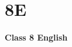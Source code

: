 \label{4 C8 English}
    \section{8E}
    \begin{frame}
    \begin{center}
    \begin{Huge}
        \textbf{Class 8 English}
    \end{Huge}
    \end{center}
    \end{frame}
 
    